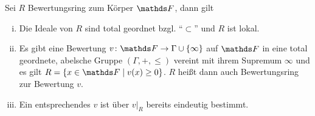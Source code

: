 \documentclass[ngerman,fontsize=11pt, paper=a4, parskip=half, titlepage=true, toc=bib]{scrartcl}
\begin{document}
\begin{Satz}\label{eigbewertungsring}
  Sei $R$ Bewertungsring zum Körper $\F$, dann gilt
  \begin{enumerate}[i)]
  \item Die Ideale von $R$ sind total geordnet bzgl. 
    \enquote{$\subset$} und $R$ ist lokal.
  \item Es gibt eine Bewertung $v\colon\F\to\Gamma\cup\{\infty\}$
    auf $\F$ in eine total geordnete, abelsche Gruppe
    $(\Gamma,+,\leq)$ vereint mit ihrem Supremum $\infty$ und es gilt
    $R=\{x\in\F\mid v(x)\geq 0\}$.
    $R$ heißt dann auch Bewertungsring zur Bewertung $v$.
  \item 
    Ein entsprechendes $v$ ist über $v|_{R}$ bereits eindeutig 
    bestimmt.
  \end{enumerate}


\end{Satz}
\end{document}
